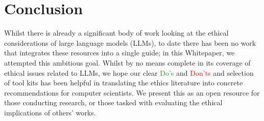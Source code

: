 \section{Conclusion}
Whilst there is already a significant body of work looking at the ethical considerations of large language models (LLMs), to date there has been no work that integrates these resources into a single guide; in this Whitepaper, we attempted this ambitious goal. Whilst by no means complete in its coverage of ethical issues related to LLMs, we hope our clear \textcolor{ForestGreen}{Do's} and \textcolor{red}{Don'ts} and selection of tool kits has been helpful in translating the ethics literature into concrete recommendations for computer scientists. We present this as an open resource for those conducting research, or those tasked with evaluating the ethical implications of others' works. 